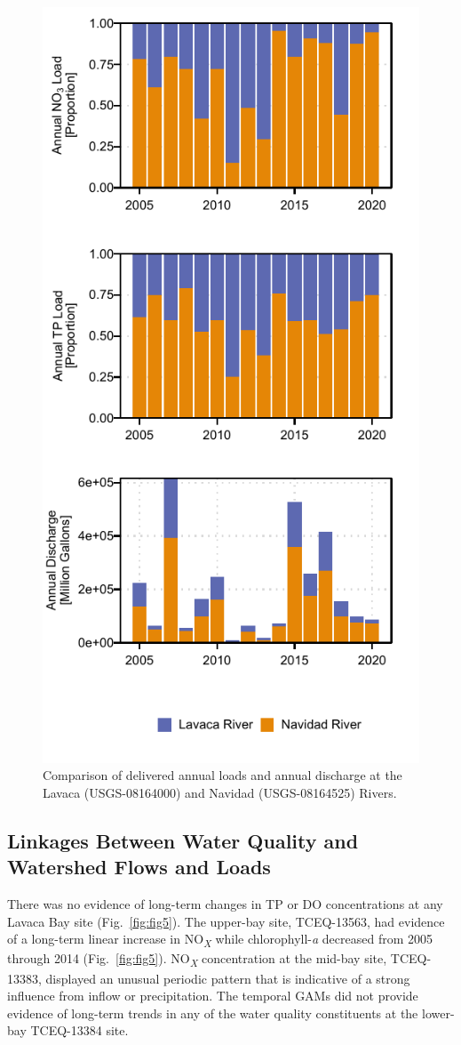 \documentclass[fleqn,10pt,lineno]{wlpeerj} %
\begin{document}
\begin{figure}

{\centering \includegraphics[width=0.5\linewidth,]{Schramm-2023-08-PeerJ_files/figure-latex/fig4} 

}

\caption{Comparison of delivered annual loads and annual discharge at the Lavaca (USGS-08164000) and Navidad (USGS-08164525) Rivers.}\label{fig:fig4}
\end{figure}

\hypertarget{linkages-between-water-quality-and-watershed-flows-and-loads}{%
\subsection*{Linkages Between Water Quality and Watershed Flows and
Loads}\label{linkages-between-water-quality-and-watershed-flows-and-loads}}

There was no evidence of long-term changes in TP or DO concentrations at
any Lavaca Bay site (Fig.~\ref{fig:fig5}). The upper-bay site,
TCEQ-13563, had evidence of a long-term linear increase in
NO\textsubscript{\emph{X}} while chlorophyll-\emph{a} decreased from
2005 through 2014 (Fig.~\ref{fig:fig5}). NO\textsubscript{\emph{X}}
concentration at the mid-bay site, TCEQ-13383, displayed an unusual
periodic pattern that is indicative of a strong influence from inflow or
precipitation. The temporal GAMs did not provide evidence of long-term
trends in any of the water quality constituents at the lower-bay
TCEQ-13384 site.
\end{document}
